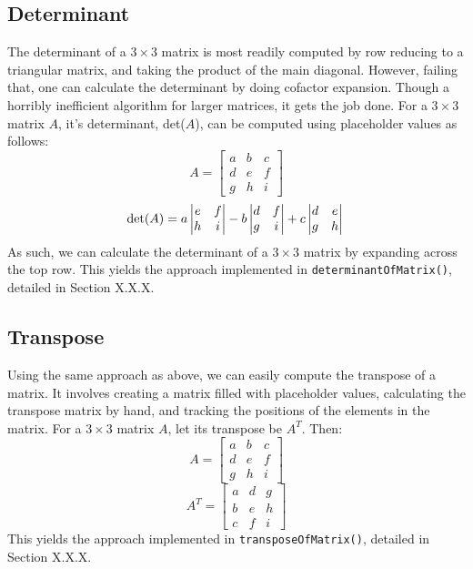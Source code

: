 \documentclass[12pt]{article}
\begin{document}
\subsection{Determinant}
The determinant of a $3\times3$ matrix is most readily computed by row reducing to a triangular matrix, and taking the product of the main diagonal. However, failing that, one can calculate the determinant by doing cofactor expansion. Though a horribly inefficient algorithm for larger matrices, it gets the job done. For a $3\times3$ matrix $A$, it's determinant, det($A$), can be computed using placeholder values as follows:
\[
A =
\begin{bmatrix}
    a & b & c \\
    d & e & f \\
    g & h & i
\end{bmatrix}
\]
\begin{equation}
\text{det($A$)} =
  a\begin{vmatrix}
  e & f\\
  h & i
  \end{vmatrix}  
  -b\begin{vmatrix}
  d & f\\
  g & i
  \end{vmatrix}  
  +c\begin{vmatrix}
  d & e\\
  g & h
  \end{vmatrix}\\\\
\end{equation}
As such, we can calculate the determinant of a $3\times3$ matrix by expanding across the top row. This yields the approach implemented in \texttt{determinantOfMatrix()}, detailed in Section X.X.X.

\subsection{Transpose}
Using the same approach as above, we can easily compute the transpose of a matrix. It involves creating a matrix filled with placeholder values, calculating the transpose matrix by hand, and tracking the positions of the elements in the matrix. For a $3\times3$ matrix $A$, let its transpose be $A^T$. Then:
\[
A =
\begin{bmatrix}
    a & b & c \\
    d & e & f \\
    g & h & i
\end{bmatrix}
\]
\begin{equation}
A^T =
    \begin{bmatrix}
    a & d & g \\
    b & e & h \\
    c & f & i
\end{bmatrix}
\end{equation}
This yields the approach implemented in \texttt{transposeOfMatrix()}, detailed in Section X.X.X.
\end{document}
